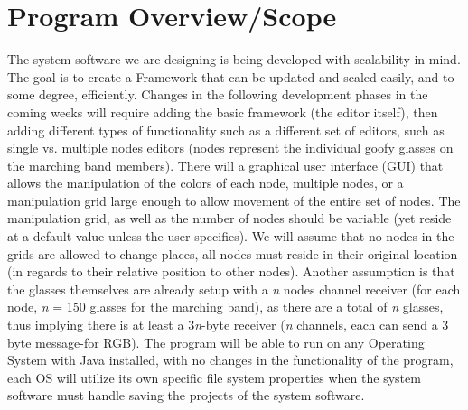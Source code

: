 \documentclass[12pt]{article}
\begin{document}
	\section{Program Overview/Scope}
	The system software we are designing is being developed with scalability in mind. The goal is to create a Framework that can be updated and scaled easily, and to some degree, efficiently. Changes in the following development phases in the coming weeks will require adding the basic framework (the editor itself), then adding different types of functionality such as a different set of editors, such as single vs. multiple nodes editors (nodes represent the individual goofy glasses on the marching band members). There will a graphical user interface (GUI) that allows the manipulation of the colors of each node, multiple nodes, or a manipulation grid large enough to allow movement of the entire set of nodes. The manipulation grid, as well as the number of nodes should be variable (yet reside at a default value unless the user specifies). We will assume that no nodes in the grids are allowed to change places, all nodes must reside in their original location (in regards to their relative position to other nodes). Another assumption is that the glasses themselves are already setup with a \textit{n} nodes channel receiver (for each node, \textit{n} = 150 glasses for the marching band), as there are a total of \textit{n} glasses, thus implying there is at least a 3\textit{n}-byte receiver (\textit{n} channels, each can send a 3 byte message-for RGB). The program will be able to run on any Operating System with Java installed, with no changes in the functionality of the program, each OS will utilize its own specific file system properties when the system software must handle saving the projects of the system software.
	
\end{document}
